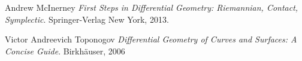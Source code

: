 \documentclass{article}
\begin{document}
\begin{thebibliography}{9}

{}
  
Andrew McInerney
\textit{First Steps in Differential Geometry: Riemannian, Contact, Symplectic}. 
Springer-Verlag New York, 2013.

Victor Andreevich Toponogov
\textit{Differential Geometry of Curves and Surfaces: A Concise Guide}. 
Birkhäuser, 2006
\end{thebibliography}
\end{document}
